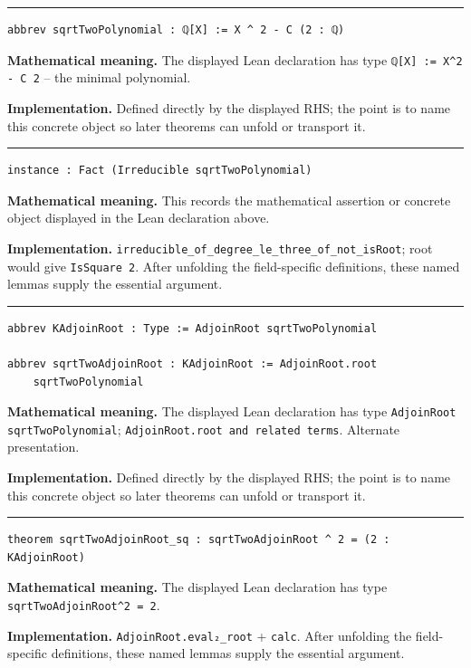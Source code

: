 \documentclass[UTF8,a4paper,11pt,fontset=fandol]{ctexart}
\theoremstyle{definition}
\newcommand{\statementsep}{\par\medskip\hrule\medskip}
\begin{document}
\statementsep
\begin{verbatim}
abbrev sqrtTwoPolynomial : ℚ[X] := X ^ 2 - C (2 : ℚ)
\end{verbatim}
\noindent\textbf{Mathematical meaning.} The displayed Lean declaration has type \texttt{ℚ[X] := X\textasciicircum{}2 - C 2} -- the minimal polynomial.\par
\noindent\textbf{Implementation.} Defined directly by the displayed RHS; the point is to name this concrete object so later theorems can unfold or transport it.\par
\statementsep
\begin{verbatim}
instance : Fact (Irreducible sqrtTwoPolynomial)
\end{verbatim}
\noindent\textbf{Mathematical meaning.} This records the mathematical assertion or concrete object displayed in the Lean declaration above.\par
\noindent\textbf{Implementation.} \texttt{irreducible\_\allowbreak{}of\_\allowbreak{}degree\_\allowbreak{}le\_\allowbreak{}three\_\allowbreak{}of\_\allowbreak{}not\_\allowbreak{}isRoot}; root would give \texttt{IsSquare 2}. After unfolding the field-specific definitions, these named lemmas supply the essential argument.\par
\statementsep
\begin{verbatim}
abbrev KAdjoinRoot : Type := AdjoinRoot sqrtTwoPolynomial

abbrev sqrtTwoAdjoinRoot : KAdjoinRoot := AdjoinRoot.root
    sqrtTwoPolynomial
\end{verbatim}
\noindent\textbf{Mathematical meaning.} The displayed Lean declaration has type \texttt{AdjoinRoot sqrtTwoPolynomial}; \texttt{AdjoinRoot.\allowbreak{}root and related terms}. Alternate presentation.\par
\noindent\textbf{Implementation.} Defined directly by the displayed RHS; the point is to name this concrete object so later theorems can unfold or transport it.\par
\statementsep
\begin{verbatim}
theorem sqrtTwoAdjoinRoot_sq : sqrtTwoAdjoinRoot ^ 2 = (2 : KAdjoinRoot)
\end{verbatim}
\noindent\textbf{Mathematical meaning.} The displayed Lean declaration has type \texttt{sqrtTwoAdjoinRoot\textasciicircum{}2 = 2}.\par
\noindent\textbf{Implementation.} \texttt{AdjoinRoot.\allowbreak{}eval₂\_\allowbreak{}root} + \texttt{calc}. After unfolding the field-specific definitions, these named lemmas supply the essential argument.\par
\end{document}
